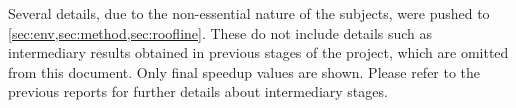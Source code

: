 Several details, due to the non-essential nature of the subjects, were pushed to \cref{sec:env,sec:method,sec:roofline}.
These do not include details such as intermediary results obtained in previous stages of the project, which are omitted from this document. Only final speedup values are shown. Please refer to the previous reports for further details about intermediary stages.






















